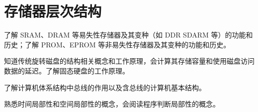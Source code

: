 \chapter{存储器层次结构}\thispagestyle{empty}
    \begin{summary}
        \begin{compactitem}
            \item 了解 SRAM、DRAM 等易失性存储器及其变种（如 DDR SDARM 等）的功能和历史；了解 PROM、EPROM 等非易失性存储器及其变种的功能和历史。
            \item 知道传统旋转磁盘的结构相关概念和工作原理，会计算其存储容量和使用磁盘访问数据的延迟。了解固态硬盘的工作原理。
            \item 了解计算机体系结构中总线的作用以及含总线的计算机基本结构。
            \item 熟悉时间局部性和空间局部性的概念，会阅读程序判断局部性的概念。
        \end{compactitem}
    \end{summary}

